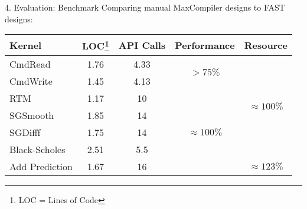 \begin{comment}
\begin{frame}{4. Evaluation: Reverse Time Migration}
  \begin{table}
  \end{table}
\end{frame}
\end{comment}

\begin{frame}{4. Evaluation: Benchmark}
  Comparing manual MaxCompiler designs to FAST designs:
{\footnotesize
  \begin{table}
    \renewcommand{\arraystretch}{1.5}
    \begin{tabular}{l|c|c|c|c}
      \textbf{Kernel} & \textbf{LOC\footnote{LOC = Lines of Code}} & \textbf{API Calls} & \textbf{Performance}              & \textbf{Resource}
      \\
      \hline\hline
      CmdRead         & 1.76               & 4.33                     & \multirow{2}{1.5cm}{$ > 75\%$}        & \multirow{6}{1.5cm}{$\approx 100\%$} \\
      CmdWrite        & 1.45               & 4.13                     &                                   &                              \\
      \cline{1-4}
      RTM             & 1.17               & 10                       & \multirow{5}{1.5cm}{$ \approx 100\%$} &                              \\
      SGSmooth        & 1.85               & 14                       &                                   &                              \\
      SGDifff         & 1.75               & 14                       &                                   &                              \\
      Black-Scholes   & 2.51               & 5.5                      &                                   &                              \\
      \cline{5-5}
      Add Prediction  & 1.67               & 16                       &                                   &    $ \approx 123 \% $                          \\
    \end{tabular}
  \end{table}}

\end{frame}